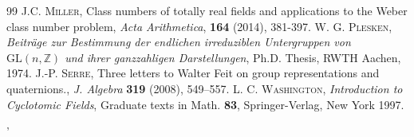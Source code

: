 \documentclass{article}
\theoremstyle{definition}
\begin{document}
\begin{thebibliography}{99}
    \textsc{J.C. Miller},
    Class numbers of totally real fields and applications to the 
    Weber class number problem,
    \textit{Acta Arithmetica}, \textbf{164} (2014),  381-397.
     \textsc{W. G. Plesken}, 
     \textit{Beitr\"age zur Bestimmung der endlichen irreduziblen 
     Untergruppen von $\mathrm{GL}(n,\mathbb{Z})$ und ihrer ganzzahligen 
     Darstellungen}, Ph.D. Thesis, RWTH Aachen, 1974.
     \textsc{J.-P. Serre}, Three letters to Walter Feit on group 
     representations and quaternions., \textit{J. Algebra} \textbf{319}
     (2008), 549–557.
    \textsc{L. C. Washington}, 
    \textit{Introduction to Cyclotomic Fields}, Graduate texts in Math. 
    \textbf{83}, Springer-Verlag, New York 1997.
\end{thebibliography}

'
\end{document}
